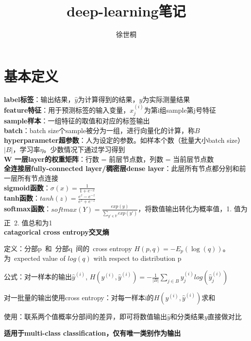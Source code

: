 \documentclass[UTF8]{ctexart}
\title{deep-learning笔记}
\author{徐世桐}
\date{}
\begin{document}
\maketitle

\section{基本定义}

\noindent \textbf{label标签}：输出结果，$\hat{y} $为计算得到的结果，$y$为实际测量结果\\
\textbf{feature特征}：用于预测标签的输入变量，$x^{(i)}_j$为第i组sample第j号特征\\
\textbf{sample样本}：一组特征的取值和对应的标签输出\\
\textbf{batch}：batch size个sample被分为一组，进行向量化的计算，称$B$\\
\textbf{hyperparameter超参数}：人为设定的参数。如样本个数（批量大小batch size）$|B|$，学习率$\eta $。少数情况下通过学习得到\\
\textbf{W 一层layer的权重矩阵}：行数 = 前层节点数，列数 = 当前层节点数\\
\textbf{全连接层fully-connected layer/稠密层dense layer}：此层所有节点都分别和前一层所有节点连接\\
\textbf{sigmoid函数}：$\sigma(x) = \frac{1}{1+e^{-x}}$\\
\textbf{tanh函数}：$tanh(z) = \frac{e^z - e^{-z}}{e^z + e^{-z}}$\\
\textbf{softmax函数}：$softmax(Y) = \frac{exp(y)}{\sum_{y' \in Y} exp(y') } $，将数值输出转化为概率值，1. 值为正\ 2. 值总和为1\\
\textbf{catagorical cross entropy交叉熵}

  定义：分部p\ 和\ 分部q\ 间的\ cross entropy $H(p, q) = -E_p(\log (q))$。为\ expected value of $log (q)$ with respect to distribution p

  公式：对一样本的输出$\hat{y}^{(i)}$, $H(y^{(i)}, \hat{y}^{(i)}) = -\frac{1}{|B|}\sum_{j\in B}y^{(i)}_jlog(\hat{y}^{(i)}_j)$

  \quad 对一批量的输出使用cross entropy：对每一样本i的$H(y^{(i)}, \hat{y}^{(i)})$求和

  使用：联系两个值概率分部间的差异，即可将数值输出$\hat{y}$和分类结果$y$直接做对比

  \quad \textbf{适用于multi-class classification，仅有唯一类别作为输出}
\end{document}
